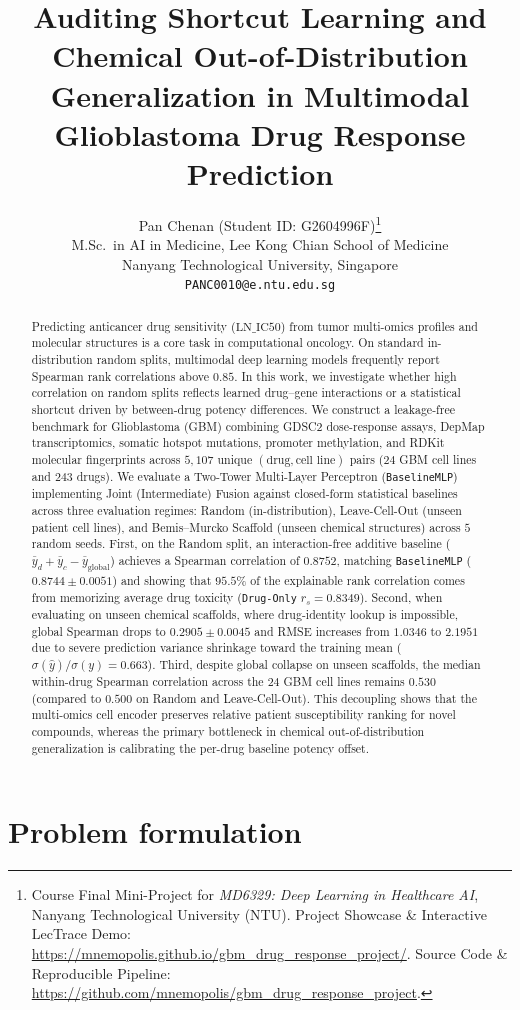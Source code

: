 \documentclass{article}
\title{Auditing Shortcut Learning and Chemical Out-of-Distribution Generalization in Multimodal Glioblastoma Drug Response Prediction}
\author{%
  Pan Chenan \quad (Student ID: G2604996F)\thanks{Course Final Mini-Project for \emph{MD6329: Deep Learning in Healthcare AI}, Nanyang Technological University (NTU). Project Showcase \& Interactive LecTrace Demo: \url{https://mnemopolis.github.io/gbm_drug_response_project/}. Source Code \& Reproducible Pipeline: \url{https://github.com/mnemopolis/gbm_drug_response_project}.} \\
  M.Sc.\ in AI in Medicine, Lee Kong Chian School of Medicine \\
  Nanyang Technological University, Singapore \\
  \texttt{PANC0010@e.ntu.edu.sg}
}
\begin{document}
\maketitle

\begin{abstract}
Predicting anticancer drug sensitivity ($\text{LN\_IC50}$) from tumor multi-omics profiles and molecular structures is a core task in computational oncology. On standard in-distribution random splits, multimodal deep learning models frequently report Spearman rank correlations above $0.85$. In this work, we investigate whether high correlation on random splits reflects learned drug--gene interactions or a statistical shortcut driven by between-drug potency differences. We construct a leakage-free benchmark for Glioblastoma (GBM) combining GDSC2 dose-response assays, DepMap transcriptomics, somatic hotspot mutations, promoter methylation, and RDKit molecular fingerprints across $5,107$ unique $(\text{drug}, \text{cell line})$ pairs ($24$ GBM cell lines and $243$ drugs). We evaluate a Two-Tower Multi-Layer Perceptron (\texttt{BaselineMLP}) implementing Joint (Intermediate) Fusion against closed-form statistical baselines across three evaluation regimes: Random (in-distribution), Leave-Cell-Out (unseen patient cell lines), and Bemis--Murcko Scaffold (unseen chemical structures) across $5$ random seeds. First, on the Random split, an interaction-free additive baseline ($\bar{y}_d + \bar{y}_c - \bar{y}_{\text{global}}$) achieves a Spearman correlation of $0.8752$, matching \texttt{BaselineMLP} ($0.8744 \pm 0.0051$) and showing that $95.5\%$ of the explainable rank correlation comes from memorizing average drug toxicity (\texttt{Drug-Only} $r_s = 0.8349$). Second, when evaluating on unseen chemical scaffolds, where drug-identity lookup is impossible, global Spearman drops to $0.2905 \pm 0.0045$ and RMSE increases from $1.0346$ to $2.1951$ due to severe prediction variance shrinkage toward the training mean ($\sigma(\hat{y})/\sigma(y) = 0.663$). Third, despite global collapse on unseen scaffolds, the median within-drug Spearman correlation across the $24$ GBM cell lines remains $0.530$ (compared to $0.500$ on Random and Leave-Cell-Out). This decoupling shows that the multi-omics cell encoder preserves relative patient susceptibility ranking for novel compounds, whereas the primary bottleneck in chemical out-of-distribution generalization is calibrating the per-drug baseline potency offset.
\end{abstract}

\section{Problem formulation}
\label{sec:problem}
\end{document}

